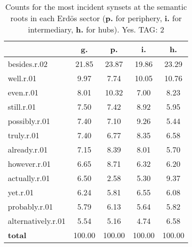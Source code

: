 \begin{table}[h!]
\begin{center}
\begin{tabular}{| l | c | c | c | c |}\hline
 & g. & p. & i. & h. \\\hline
besides.r.02 & 21.85  & 23.87  & 19.86  & 23.29 \\\hline
well.r.01 & 9.97  & 7.74  & 10.05  & 10.76 \\\hline
even.r.01 & 8.01  & 10.32  & 7.00  & 8.23 \\\hline
still.r.01 & 7.50  & 7.42  & 8.92  & 5.95 \\\hline
possibly.r.01 & 7.40  & 7.10  & 9.26  & 5.44 \\\hline
truly.r.01 & 7.40  & 6.77  & 8.35  & 6.58 \\\hline
already.r.01 & 7.15  & 8.39  & 8.01  & 5.70 \\\hline
however.r.01 & 6.65  & 8.71  & 6.32  & 6.20 \\\hline
actually.r.01 & 6.50  & 2.58  & 5.30  & 9.37 \\\hline
yet.r.01 & 6.24  & 5.81  & 6.55  & 6.08 \\\hline
probably.r.01 & 5.79  & 6.13  & 5.64  & 5.82 \\\hline
alternatively.r.01 & 5.54  & 5.16  & 4.74  & 6.58 \\\hline
{{\bf total}} & 100.00  & 100.00  & 100.00  & 100.00 \\\hline
\end{tabular}
\caption{Counts for the most incident synsets at the semantic roots in each Erd\"os sector ({\bf p.} for periphery, {\bf i.} for intermediary, {\bf h.} for hubs). Yes. TAG: 2}
\end{center}
\end{table}